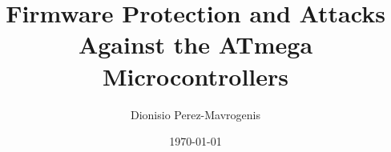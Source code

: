 \documentclass[10pt,journal,compsoc,a4paper]{IEEEtran}
\author{Dionisio Perez-Mavrogenis}
\title{Firmware Protection and Attacks Against the ATmega Microcontrollers}
\date{\today}
\begin{document}
	\maketitle





	



	

{\footnotesize 	}
\end{document}
